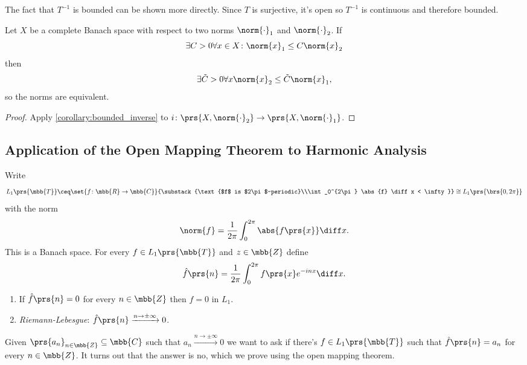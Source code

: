 \documentclass[10pt, twoside]{book}
\begin{document}
\begin{remark}
The fact that $T^{-1}$ is bounded can be shown more directly. Since $T$ is surjective, it's open so $T^{-1}$ is continuous and therefore bounded.
\end{remark}

\begin{corollary}
Let $X$ be a complete Banach space with respect to two norms $\norm{\cdot}_1$ and $\norm{\cdot}_2$.
If
\[\exists C > 0 \forall x \in X \colon \norm{x}_1 \leq C \norm{x}_2\]
then
\[\exists \tilde{C} > 0 \forall x \norm{x}_2 \leq \tilde{C} \norm{x}_1 \text{,}\]
so the norms are equivalent.
\end{corollary}

\begin{proof}
Apply \ref{corollary:bounded_inverse} to $i \colon \prs{X, \norm{\cdot}_2} \to \prs{X, \norm{\cdot}_1}$.
\end{proof}

\subsection{Application of the Open Mapping Theorem to Harmonic Analysis}

\begin{definition}
Write
\[L_1\prs{\mbb{T}} \ceq \set{f \colon \mbb{R} \to \mbb{C}}{\substack{\text{$f$ is $2\pi$-periodic}\\\int_0^{2\pi} \abs{f} \diff x < \infty}} \cong L_1\prs{\brs{0, 2 \pi}}\]
with the norm
\[\norm{f} = \frac{1}{2 \pi} \int_0^{2\pi} \abs{f\prs{x}} \diff x \text{.}\]
This is a Banach space.
For every $f \in L_1\prs{\mbb{T}}$ and $z \in \mbb{Z}$ define
\[\hat{f}\prs{n} = \frac{1}{2\pi} \int_0^{2 \pi} f\prs{x} e^{-inx} \diff x \text{.}\]
\end{definition}

\begin{fact} \label{fact:riemann_lebesgue}
\begin{enumerate}
\item If $\hat{f} \prs{n} = 0$ for every $n \in \mbb{Z}$ then $f = 0$ in $L_1$.
\item \emph{Riemann-Lebesgue}: $\hat{f}\prs{n} \xrightarrow{n\to\pm \infty} 0$.
\end{enumerate}
\end{fact}

Given $\prs{a_n}_{n \in \mbb{Z}} \subseteq \mbb{C}$ such that $a_n \xrightarrow{n \to \pm \infty} 0$ we want to ask if there's $f \in L_1\prs{\mbb{T}}$ such that $\hat{f}\prs{n} = a_n$ for every $n \in \mbb{Z}$.
It turns out that the answer is no, which we prove using the open mapping theorem.
\end{document}
